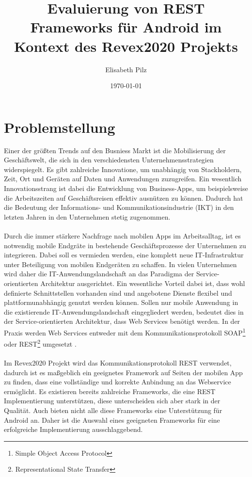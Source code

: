 \documentclass[a4paper,11pt,german,public]{INSOexpose}
\title{\centering Evaluierung von REST Frameworks für Android im Kontext des Revex2020 Projekts\\}
\author{Elisabeth Pilz}
\date{\today}
\begin{document}
\maketitle
{}
\section{Problemstellung}

Einer der größten Trends auf den Busniess Markt ist die Mobilisierung der Geschäftswelt, die sich in den verschiedensten Unternehmensstrategien widerspiegelt. Es gibt zahlreiche Innovatione, um unabhängig von Stackholdern, Zeit, Ort und Geräten auf Daten und Anwendungen zuzugreifen. Ein wesentlich Innovationsstrang ist dabei die Entwicklung von Business-Apps, um beispielsweise die Arbeitszeiten auf Geschäftsreisen effektiv ausnützen zu können. Dadurch hat die Bedeutung der Informations- und Kommunikationsindustrie (IKT) in den letzten Jahren in den Unternehmen stetig zugenommen\cite{smartMobileApps1}.
\\\\
Durch die immer stärkere Nachfrage nach mobilen Apps im Arbeitsalltag, ist es notwendig mobile Endgräte in bestehende Geschäftsprozesse der Unternehmen zu integrieren. Dabei soll es vermieden werden, eine komplett neue IT-Infrastruktur unter Beteiligung von mobilen Endgeräten zu schaffen. In vielen Unternehmen wird daher die IT-Anwendungslandschaft  an das Paradigma der Service-orientierten Architektur ausgerichtet. Ein wesentliche Vorteil dabei ist, dass wohl definierte Schnittstellen vorhanden sind und angebotene Dienste flexibel und plattformunabhängig genutzt werden können. Sollen nur mobile Anwendung in die existierende  IT-Anwendungslandschaft eingegliedert werden, bedeutet dies in der Service-orientierten Architektur, dass Web Services benötigt werden. In der Praxis werden Web Services entweder mit dem Kommunikationsprotokoll SOAP\footnote{Simple Object Access Protocol} oder REST\footnote{Representational State Transfer} umgesetzt \cite{smartMobileApps17}.
\\\\
Im  Revex2020 Projekt wird das Kommunikationsprotokoll REST verwendet, dadurch ist es maßgeblich ein geeignetes Framework auf Seiten der mobilen App zu finden, dass eine vollständige und korrekte Anbindung an das Webservice ermöglicht. Es existieren bereits zahlreiche Frameworks, die eine REST Implementierung unterstützen, diese unterscheiden sich aber stark in der Qualität. Auch bieten nicht alle diese Frameworks eine Unterstützung für Android an. Daher ist die Auswahl eines geeigneten Frameworks für eine erfolgreiche Implementierung  ausschlaggebend. 
\end{document}
